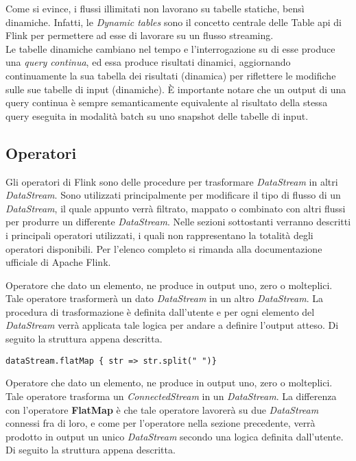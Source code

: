 Come si evince, i flussi illimitati non lavorano su tabelle statiche, bensì dinamiche. Infatti, le \textit{Dynamic tables} sono il concetto centrale delle Table \gls{api} di Flink per permettere ad esse di lavorare su un flusso streaming.\\
Le tabelle dinamiche cambiano nel tempo e l'interrogazione su di esse produce una \textit{\gls{query} continua}, ed essa produce risultati dinamici, aggiornando continuamente la sua tabella dei risultati (dinamica) per riflettere le modifiche sulle sue tabelle di input (dinamiche). È importante notare che un output di una \gls{query} continua è sempre semanticamente equivalente al risultato della stessa \gls{query} eseguita in modalità batch su uno \gls{snapshot} delle tabelle di input.



\subsection{Operatori}\label{sec:operatori}
Gli operatori di Flink sono delle procedure per trasformare \textit{DataStream} in altri \textit{DataStream}. Sono utilizzati principalmente per modificare il tipo di flusso di un \textit{DataStream}, il quale appunto verrà filtrato, mappato o combinato con altri flussi per produrre un differente \textit{DataStream}. Nelle sezioni sottostanti verranno descritti i principali operatori utilizzati, i quali non rappresentano la totalità degli operatori disponibili. Per l'elenco completo si rimanda alla documentazione ufficiale di Apache Flink.

Operatore che dato un elemento, ne produce in output uno, zero o molteplici. Tale operatore trasformerà un dato \textit{DataStream} in un altro \textit{DataStream}. La procedura di trasformazione è definita dall'utente e per ogni elemento del \textit{DataStream} verrà applicata tale logica per andare a definire l'output atteso. Di seguito la struttura appena descritta.

\begin{verbatim}
dataStream.flatMap { str => str.split(" ")}
\end{verbatim}
	
	
Operatore che dato un elemento, ne produce in output uno, zero o molteplici. Tale operatore trasforma un \textit{ConnectedStream} in un \textit{DataStream}. La differenza con l'operatore \textbf{FlatMap} è che tale operatore lavorerà su due \textit{DataStream} connessi fra di loro, e come per l'operatore nella sezione precedente, verrà prodotto in output un unico \textit{DataStream} secondo una logica definita dall'utente. Di seguito la struttura appena descritta.

